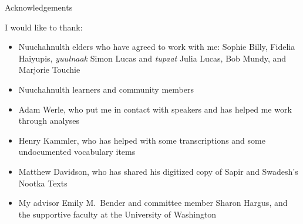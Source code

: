 \begin{frame}{Acknowledgements}

I would like to thank:
\begin{itemize}
	\item Nuuchahnulth elders who have agreed to work with me: Sophie Billy, Fidelia Haiyupis, \textit{yuułnaak} Simon Lucas and \textit{tupaat} Julia Lucas, Bob Mundy, and Marjorie Touchie
	\item Nuuchahnulth learners and community members
	\item Adam Werle, who put me in contact with speakers and has helped me work through analyses
	\item Henry Kammler, who has helped with some transcriptions and some undocumented vocabulary items
	\item Matthew Davidson, who has shared his digitized copy of Sapir and Swadesh's Nootka Texts
	\item My advisor Emily M.\ Bender and committee member Sharon Hargus, and the supportive faculty at the University of Washington
\end{itemize}
	
\end{frame}
